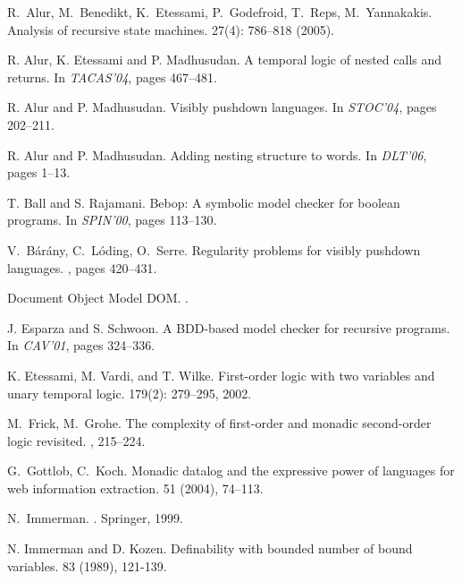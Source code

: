 \documentclass{LMCS}
\theoremstyle{plain}
\theoremstyle{definition}
\begin{document}
\begin{thebibliography}{99}



R.~Alur, M.~Benedikt, K.~Etessami, P.~Godefroid, T.~Reps, M.~Yannakakis.
\newblock Analysis of recursive state machines. 
 27(4): 786--818 (2005). 

R. Alur, K. Etessami and P. Madhusudan. 
\newblock A temporal logic of nested calls and returns.  
\newblock In {\em TACAS'04}, pages 467--481.  

R. Alur and P. Madhusudan. 
\newblock Visibly pushdown languages.  
\newblock In {\em STOC'04}, pages 202--211. 

R. Alur and P. Madhusudan. 
\newblock Adding nesting structure to words.  
\newblock In {\em DLT'06}, pages 1--13.

T. Ball and S. Rajamani.
\newblock Bebop: A symbolic model checker for boolean programs.
\newblock In {\em SPIN'00}, pages 113--130.

V.~B\'ar\'any, C.~L\'oding, O.~Serre.
\newblock  Regularity problems for visibly pushdown languages. 
, pages 420--431. 

Document Object Model DOM.
.

J. Esparza and S. Schwoon.
\newblock A BDD-based model checker for recursive programs.
\newblock In {\em CAV'01},
pages {324--336}. 


K. Etessami, M. Vardi, and T. Wilke. 
\newblock First-order logic with two variables and unary temporal
logic.  
 179(2): 279--295, 2002.   

M.~Frick, M.~Grohe.
\newblock  The complexity of first-order and monadic second-order
logic revisited. 
, 215--224. 


G.~Gottlob, C.~Koch.
\newblock Monadic datalog and the expressive power of languages for
web information extraction. 
 51 (2004), 74--113. 

N.~Immerman.
. \newblock Springer, 1999.

N. Immerman and D. Kozen.
\newblock Definability with bounded number
    of bound variables.  83 (1989), 121-139. 


\end{thebibliography}
\end{document}
